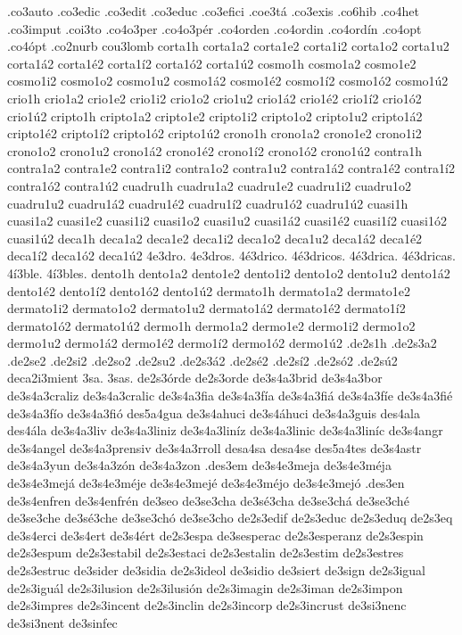{.co3auto
.co3edic
.co3edit
.co3educ
.co3efici
.coe3tá
.co3exis
.co6hib
.co4het
.co3imput
.coi3to
.co4o3per
.co4o3pér
.co4orden
.co4ordin
.co4ordín
.co4opt
.co4ópt
.co2nurb
cou3lomb
corta1h
corta1a2 corta1e2 corta1i2 corta1o2 corta1u2
corta1á2 corta1é2 corta1í2 corta1ó2 corta1ú2
cosmo1h
cosmo1a2 cosmo1e2 cosmo1i2 cosmo1o2 cosmo1u2
cosmo1á2 cosmo1é2 cosmo1í2 cosmo1ó2 cosmo1ú2
crio1h
crio1a2 crio1e2 crio1i2 crio1o2 crio1u2
crio1á2 crio1é2 crio1í2 crio1ó2 crio1ú2
cripto1h
cripto1a2 cripto1e2 cripto1i2 cripto1o2 cripto1u2
cripto1á2 cripto1é2 cripto1í2 cripto1ó2 cripto1ú2
crono1h
crono1a2 crono1e2 crono1i2 crono1o2 crono1u2
crono1á2 crono1é2 crono1í2 crono1ó2 crono1ú2
contra1h
contra1a2 contra1e2 contra1i2 contra1o2 contra1u2
contra1á2 contra1é2 contra1í2 contra1ó2 contra1ú2
cuadru1h
cuadru1a2 cuadru1e2 cuadru1i2 cuadru1o2 cuadru1u2
cuadru1á2 cuadru1é2 cuadru1í2 cuadru1ó2 cuadru1ú2
cuasi1h
cuasi1a2 cuasi1e2 cuasi1i2 cuasi1o2 cuasi1u2
cuasi1á2 cuasi1é2 cuasi1í2 cuasi1ó2 cuasi1ú2
deca1h
deca1a2 deca1e2 deca1i2 deca1o2 deca1u2
deca1á2 deca1é2 deca1í2 deca1ó2 deca1ú2
4e3dro.
4e3dros.
4é3drico.
4é3dricos.
4é3drica.
4é3dricas.
4í3ble.
4í3bles.
dento1h
dento1a2 dento1e2 dento1i2 dento1o2 dento1u2
dento1á2 dento1é2 dento1í2 dento1ó2 dento1ú2
dermato1h
dermato1a2 dermato1e2 dermato1i2 dermato1o2 dermato1u2
dermato1á2 dermato1é2 dermato1í2 dermato1ó2 dermato1ú2
dermo1h
dermo1a2 dermo1e2 dermo1i2 dermo1o2 dermo1u2
dermo1á2 dermo1é2 dermo1í2 dermo1ó2 dermo1ú2
.de2s1h
.de2s3a2
.de2se2
.de2si2
.de2so2
.de2su2
.de2s3á2
.de2sé2
.de2sí2
.de2só2
.de2sú2
deca2i3mient
3sa.
3sas.
de2s3órde
de2s3orde
de3s4a3brid
de3s4a3bor
de3s4a3craliz
de3s4a3cralic
de3s4a3fia
de3s4a3fía
de3s4a3fiá
de3s4a3fíe
de3s4a3fié
de3s4a3fío
de3s4a3fió
des5a4gua
de3s4ahuci
de3s4áhuci
de3s4a3guis
des4ala
des4ála
de3s4a3liv
de3s4a3liniz
de3s4a3liníz
de3s4a3linic
de3s4a3liníc
de3s4angr
de3s4angel
de3s4a3prensiv
de3s4a3rroll
desa4sa
desa4se
des5a4tes
de3s4astr
de3s4a3yun
de3s4a3zón
de3s4a3zon
.des3em
de3s4e3meja
de3s4e3méja
de3s4e3mejá
de3s4e3méje
de3s4e3mejé
de3s4e3méjo
de3s4e3mejó
.des3en
de3s4enfren
de3s4enfrén
de3seo
de3se3cha
de3sé3cha
de3se3chá
de3se3ché
de3se3che
de3sé3che
de3se3chó
de3se3cho
de2s3edif
de2s3educ
de2s3eduq
de2s3eq
de3s4erci
de3s4ert
de3s4ért
de2s3espa
de3sesperac
de2s3esperanz
de2s3espin
de2s3espum
de2s3estabil
de2s3estaci
de2s3estalin
de2s3estim
de2s3estres
de2s3estruc
de3sider
de3sidia
de2s3ideol
de3sidio
de3siert
de3sign
de2s3igual
de2s3iguál
de2s3ilusion
de2s3ilusión
de2s3imagin
de2s3iman
de2s3impon
de2s3impres
de2s3incent
de2s3inclin
de2s3incorp
de2s3incrust
de3si3nenc
de3si3nent
de3sinfec
}
